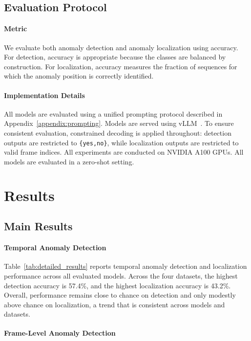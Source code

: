 \documentclass[11pt]{article}
\begin{document}
\subsection{Evaluation Protocol}

\paragraph{Metric}
We evaluate both anomaly detection and anomaly localization using accuracy. For detection, accuracy is appropriate because the classes are balanced by construction. For localization, accuracy measures the fraction of sequences for which the anomaly position is correctly identified.

\paragraph{Implementation Details}
All models are evaluated using a unified prompting protocol described in Appendix~\ref{appendix:prompting}. Models are served using vLLM~\cite{kwon2023efficient}. To ensure consistent evaluation, constrained decoding is applied throughout: detection outputs are restricted to \texttt{\{yes,no\}}, while localization outputs are restricted to valid frame indices. All experiments are conducted on NVIDIA A100 GPUs. All models are evaluated in a zero-shot setting.

\section{Results}

\subsection{Main Results}

\paragraph{Temporal Anomaly Detection} Table~\ref{tab:detailed_results} reports temporal anomaly detection and localization performance across all evaluated models. Across the four datasets, the highest detection accuracy is 57.4\%, and the highest localization accuracy is 43.2\%. Overall, performance remains close to chance on detection and only modestly above chance on localization, a trend that is consistent across models and datasets.

\paragraph{Frame-Level Anomaly Detection}
\end{document}
